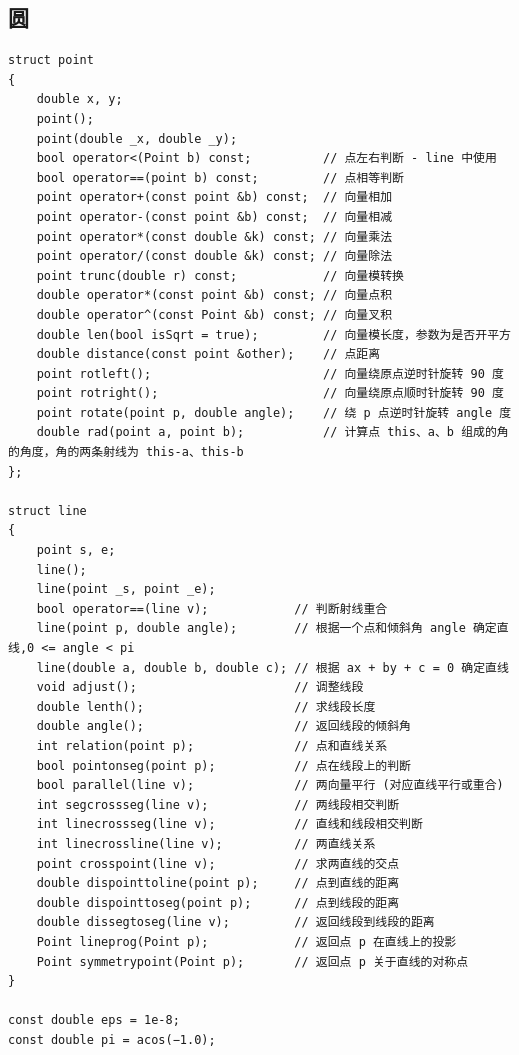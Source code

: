 \documentclass[twoside]{article}
\begin{document}
\subsection{圆}
\begin{lstlisting}
struct point
{
    double x, y;
    point();
    point(double _x, double _y);
    bool operator<(Point b) const;          // 点左右判断 - line 中使用
    bool operator==(point b) const;         // 点相等判断
    point operator+(const point &b) const;  // 向量相加
    point operator-(const point &b) const;  // 向量相减
    point operator*(const double &k) const; // 向量乘法
    point operator/(const double &k) const; // 向量除法
    point trunc(double r) const;            // 向量模转换
    double operator*(const point &b) const; // 向量点积
    double operator^(const Point &b) const; // 向量叉积
    double len(bool isSqrt = true);         // 向量模长度，参数为是否开平方
    double distance(const point &other);    // 点距离
    point rotleft();                        // 向量绕原点逆时针旋转 90 度
    point rotright();                       // 向量绕原点顺时针旋转 90 度
    point rotate(point p, double angle);    // 绕 p 点逆时针旋转 angle 度
    double rad(point a, point b);           // 计算点 this、a、b 组成的角的角度，角的两条射线为 this-a、this-b
};

struct line
{
    point s, e;
    line();
    line(point _s, point _e);
    bool operator==(line v);            // 判断射线重合
    line(point p, double angle);        // 根据一个点和倾斜角 angle 确定直线,0 <= angle < pi
    line(double a, double b, double c); // 根据 ax + by + c = 0 确定直线
    void adjust();                      // 调整线段
    double lenth();                     // 求线段长度
    double angle();                     // 返回线段的倾斜角
    int relation(point p);              // 点和直线关系
    bool pointonseg(point p);           // 点在线段上的判断
    bool parallel(line v);              // 两向量平行 (对应直线平行或重合)
    int segcrossseg(line v);            // 两线段相交判断
    int linecrossseg(line v);           // 直线和线段相交判断
    int linecrossline(line v);          // 两直线关系
    point crosspoint(line v);           // 求两直线的交点
    double dispointtoline(point p);     // 点到直线的距离
    double dispointtoseg(point p);      // 点到线段的距离
    double dissegtoseg(line v);         // 返回线段到线段的距离
    Point lineprog(Point p);            // 返回点 p 在直线上的投影
    Point symmetrypoint(Point p);       // 返回点 p 关于直线的对称点
}

const double eps = 1e-8;
const double pi = acos(−1.0);


\end{lstlisting}
\end{document}
